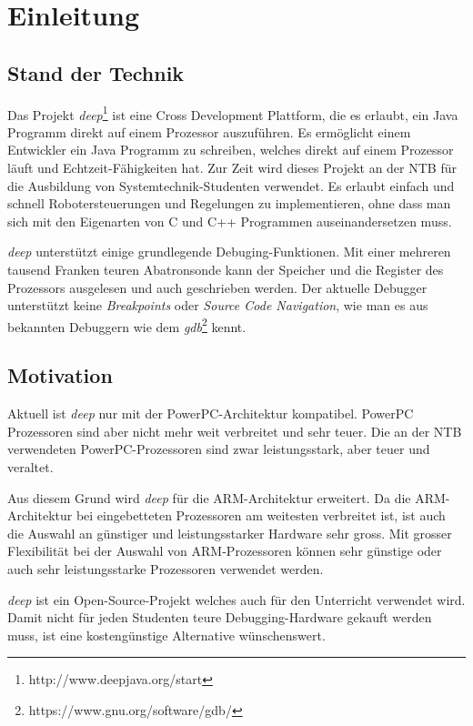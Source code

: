 \chapter{Einleitung}


\section{Stand der Technik}
Das Projekt \textit{deep}\footnote{http://www.deepjava.org/start} ist eine Cross Development Plattform, die es erlaubt, ein Java Programm direkt auf einem Prozessor auszuführen.
Es ermöglicht einem Entwickler ein Java Programm zu schreiben, welches direkt auf einem Prozessor läuft und Echtzeit-Fähigkeiten hat.
Zur Zeit wird dieses Projekt an der NTB für die Ausbildung von Systemtechnik-Studenten verwendet.
Es erlaubt einfach und schnell Robotersteuerungen und Regelungen zu implementieren, ohne dass man sich mit den Eigenarten von C und C++ Programmen auseinandersetzen muss.

\textit{deep} unterstützt einige grundlegende Debuging-Funktionen.
Mit einer mehreren tausend Franken teuren Abatronsonde kann der Speicher und die Register des Prozessors ausgelesen und auch geschrieben werden.
Der aktuelle Debugger unterstützt keine \textit{Breakpoints} oder \textit{Source Code Navigation}, wie man es aus bekannten Debuggern wie dem \textit{gdb}\footnote{https://www.gnu.org/software/gdb/} kennt.



\section{Motivation}
Aktuell ist \textit{deep} nur mit der PowerPC-Architektur kompatibel.
PowerPC Prozessoren sind aber nicht mehr weit verbreitet und sehr teuer.
Die an der NTB verwendeten PowerPC-Prozessoren sind zwar leistungsstark, aber teuer und veraltet.

Aus diesem Grund wird \textit{deep} für die ARM-Architektur erweitert.
Da die ARM-Architektur bei eingebetteten Prozessoren am weitesten verbreitet ist, ist auch die Auswahl an günstiger und leistungsstarker Hardware sehr gross.
Mit grosser Flexibilität bei der Auswahl von ARM-Prozessoren können sehr günstige oder auch sehr leistungsstarke Prozessoren verwendet werden.

\textit{deep} ist ein Open-Source-Projekt welches auch für den Unterricht verwendet wird.
Damit nicht für jeden Studenten teure Debugging-Hardware gekauft werden muss, ist eine kostengünstige Alternative wünschenswert.

